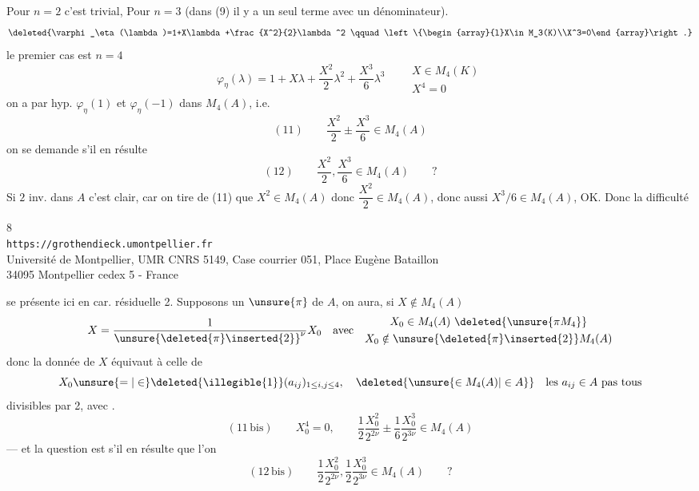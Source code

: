 Pour $n=2$ c'est trivial, Pour $n=3$ \uline{}
(dans (9) il y a un seul terme avec un dénominateur).
\[
\deleted{\varphi_\eta(\lambda)=1+X\lambda+\frac{X^2}{2}\lambda^2
\qquad\left\{\begin{array}{l}X\in M_3(K)\\X^3=0\end{array}\right.}
\]
le premier cas  est $n=4$
\[
\varphi_\eta(\lambda)=1+X\lambda+\frac{X^2}{2}\lambda^2+
\frac{X^3}{6}\lambda^3
\qquad\begin{array}{l}X\in M_4(K)\\X^4=0\end{array}
\]
on a par hyp. $\varphi_\eta(1)$ et $\varphi_\eta(-1)$ dans $M_4(A)$,
i.e.
\[
(11)\qquad \frac{X^2}{2}\mathbin{\pm}\frac{X^3}{6}\in M_4(A)
\]
on se demande s'il en résulte
\[
(12)\qquad \frac{X^2}{2},\frac{X^3}{6}\in M_4(A)\qquad ?
\]
Si $2$ inv. dans $A$ c'est clair, car on tire de (11) que $X^2\in M_4(A)$
donc $\dfrac{X^2}{2}\in M_4(A)$, donc aussi $X^3/6\in M_4(A)$, OK.
Donc la difficulté

\begin{center}
\small
8\\
\texttt{https://grothendieck.umontpellier.fr}\\
Université de Montpellier, UMR CNRS 5149, Case courrier 051, Place Eugène Bataillon\\
34095 Montpellier cedex 5 - France
\end{center}

se présente ici en car. résiduelle 2.  Supposons \deleted{\unsure{$\pi$}}  un  $\unsure{\pi}$ de $A$, on aura, si $X\notin M_4(A)$
\[
X=\frac{1}{\unsure{\deleted{\pi}\inserted{2}}^{\nu}}X_0
\quad\text{avec}\quad
\begin{gathered}
X_0\in M_4(A)\ \deleted{\unsure{\pi M_4}}\\
X_0\notin \unsure{\deleted{\pi}\inserted{2}}M_4(A)
\end{gathered}
\]
donc  la donnée de $X$ équivaut à celle de
\[
X_0\unsure{=|\in}\deleted{\illegible{1}}(a_{ij})_{1\leq i,j\leq4},\quad
\deleted{\unsure{\in M_4(A)|\in A}}\quad\text{les }a_{ij}\in A\text{ pas tous}
\]
divisibles par 2, avec .
\[
(11\,\text{bis})\qquad X_0^4=0,\qquad
\frac12\frac{X_0^2}{2^{2\nu}}\pm\frac16\frac{X_0^3}{2^{3\nu}}\in M_4(A)
\]
--- et la question est s'il en résulte que l'on 
\[
(12\,\text{bis})\qquad
\frac12\frac{X_0^2}{2^{2\nu}},\frac12\frac{X_0^3}{2^{3\nu}}\in M_4(A)\qquad ?
\]

